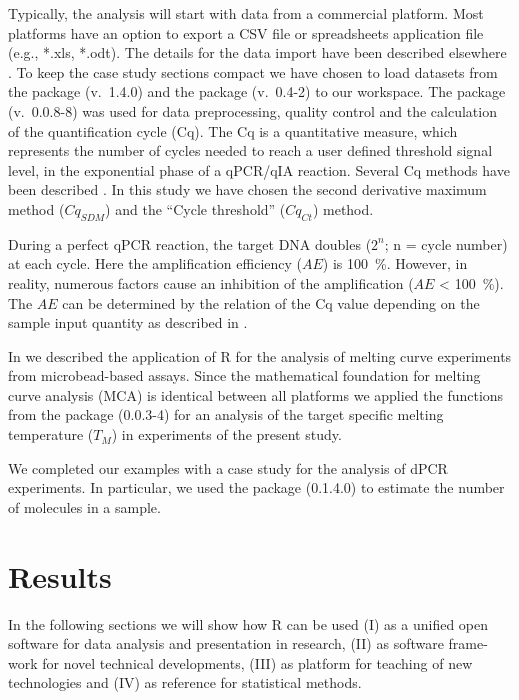Typically, the analysis will start with data from a commercial platform. 
Most platforms have an option to export a CSV file or spreadsheets application 
file (e.g., *.xls, *.odt). The details for the data import have been described 
elsewhere \citep{RDCT2010c, rodiger_rkward_2012}. To keep the case study 
sections compact we have chosen to load datasets from the  
package 
\citep{ritz_2008, spiess_2008} (v.~1.4.0) and the  package 
(v.~0.4-2) to our workspace. The  package 
\citep{roediger_2015_Bioinformatics} (v.~0.0.8-8) was used 
for data preprocessing, quality control and  the calculation of the 
quantification cycle (Cq). The Cq is a quantitative measure, which represents 
the number of cycles needed to reach a user defined threshold signal level, in 
the exponential phase of a qPCR/qIA reaction. Several Cq methods have been 
described \citep{ruijter_2013}. In this study we have chosen the second 
derivative maximum method ($Cq_{SDM}$) and the ``Cycle threshold'' ($Cq_{Ct}$) 
method.

During a perfect qPCR reaction, the target DNA doubles ($2^{n}$; n = cycle 
number) at each cycle. Here the amplification efficiency ($AE$) is 100~\%. 
However, in reality, numerous factors cause an inhibition of the amplification 
($AE$ < 100~\%). The $AE$ can be determined by the relation of the Cq value 
depending on the sample input quantity as described in 
\citet{roediger_2015_Bioinformatics, svec_2015}.

In \citet{roediger_RJ_2013} we described the application of R for the analysis 
of melting curve experiments from microbead-based assays. Since the 
mathematical 
foundation for melting curve analysis (MCA) is identical between all platforms 
we applied the functions from the  package (0.0.3-4) for an 
analysis of the target specific melting temperature ($T_{M}$) in experiments of 
the present study.

We completed our examples with a case study for the analysis of dPCR 
experiments. In particular, we used the  package (0.1.4.0) to 
estimate the 
number of molecules in a sample.

\section{Results}

In the following sections we will show how R can be used (I) as a unified open 
software for data analysis and presentation in research, 
(II) as software frame-work for novel technical developments, (III) as platform 
for teaching of new technologies and (IV) as reference for statistical methods.

